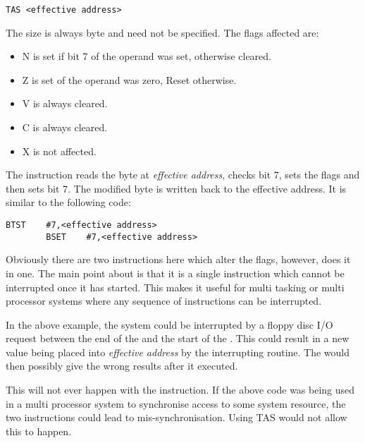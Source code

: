 \begin{lstlisting}[firstnumber=1,]
        TAS <effective address>
\end{lstlisting}

The size is always byte and need not be specified. The flags
      affected are:
\begin{itemize}[itemsep=0pt]

\item{}N is set if bit 7 of the operand was set, otherwise
          cleared.


\item{}Z is set of the operand was zero, Reset otherwise.


\item{}V is always cleared.


\item{}C is always cleared.


\item{}X is not affected.

\end{itemize}

The instruction reads the byte at \emph{effective address},
      checks bit 7, sets the flags and then sets bit 7. The modified byte is
      written back to the effective address. It is similar to the following
      code:

\begin{lstlisting}[firstnumber=1,]
        BTST    #7,<effective address>
        BSET    #7,<effective address>
\end{lstlisting}

Obviously there are two instructions here which alter the flags,
      however,  does it in one. The main point about  is that it is a
      single instruction which cannot be interrupted once it has started. This
      makes it useful for multi tasking or multi processor systems where any
      sequence of instructions can be interrupted.

In the above example, the system could be interrupted by a floppy
      disc I/O request between the end of the  and the start of the .
      This could result in a new value being placed into \emph{effective
      address} by the interrupting routine. The  would then possibly
      give the wrong results after it executed.

This will not ever happen with the  instruction. If the above
      code was being used in a multi processor system to synchronise access to
      some system resource, the two instructions could lead to
      mis-{}synchronisation. Using TAS would not allow this to happen.


